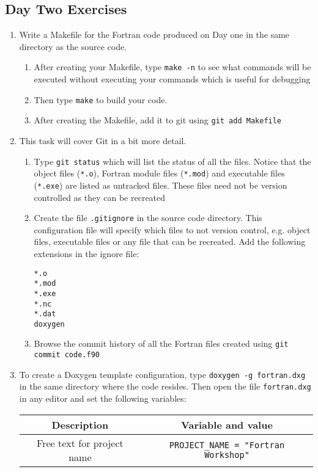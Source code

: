 \documentclass[12pt]{article}
\begin{document}
\subsection*{Day Two Exercises}
\begin{enumerate}
\item Write a Makefile for the Fortran code produced on Day one in the same directory as the source
code. 
\begin{enumerate}
\item After creating your Makefile, type \texttt{make -n} to see what commands will be executed without executing
your commands which is useful for debugging
\item Then type \texttt{make} to build your code. 
\item After creating the Makefile, add it to git using \texttt{git add Makefile}
\end{enumerate}
\item This task will cover Git in a bit more detail.
\begin{enumerate}
\item Type \texttt{git status} which will list the status of all the files. Notice that the object 
files (\texttt{*.o}), Fortran module files (\texttt{*.mod}) and executable files (\texttt{*.exe}) are listed as 
untracked files. These files need not be version controlled as they can be recreated
\item Create the file \texttt{.gitignore} in the source code directory. This configuration file will 
specify which files to not version control, e.g. object files, executable files or any file that can
be recreated. Add the following extensions in the ignore file:
\begin{verbatim}
*.o
*.mod
*.exe
*.nc
*.dat
doxygen
\end{verbatim}
\item Browse the commit history of all the Fortran files created using \texttt{git commit code.f90}
\end{enumerate}
\item To create a Doxygen template configuration, type \texttt{doxygen -g fortran.dxg} in the same
directory where the code resides. Then open the file \texttt{fortran.dxg} in any editor and set the 
following variables:
\begin{center}
\begin{tabular}{| c | c |} \hline
Description & Variable and value \\ \hline
Free text for project name & \texttt{PROJECT\_NAME = "Fortran Workshop"} \\ \hline

\end{tabular}
\end{center}
\end{enumerate}
\end{document}
